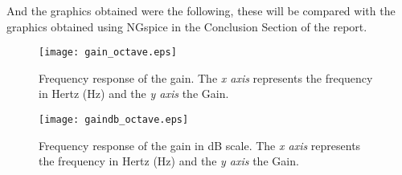 And the graphics obtained were the following, these will be compared with the graphics obtained using NGspice in the Conclusion Section of the report.

\begin{figure}[H] \centering
	\texttt{[image: gain\_octave.eps]}
	\caption{Frequency response of the gain. The \textit{x axis} represents the frequency in Hertz (Hz) and the \textit{y axis} the Gain.}
	\label{fig:teo_gain}
\end{figure}

\begin{figure}[H] \centering
	\texttt{[image: gaindb\_octave.eps]}
	\caption {Frequency response of the gain in dB scale. The \textit{x axis} represents the frequency in Hertz (Hz) and the \textit{y axis} the Gain.}
	\label{fig:teo_gaindB}
\end{figure}
